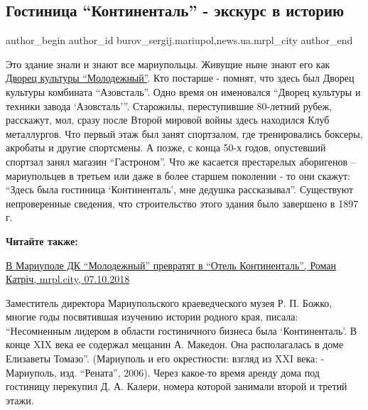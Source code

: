  
 
 
 
 
 
\subsection{Гостиница \enquote{Континенталь} - экскурс в историю}
\label{sec:22_12_2018.stz.news.ua.mrpl_city.1.gostinica_kontinental_ekskurs_v_istoriu}
 
\ifcmt
 author_begin
   author_id burov_sergij.mariupol,news.ua.mrpl_city
 author_end
\fi

Это здание знали и знают все мариупольцы. Живущие ныне знают его как \href{https://mrpl.city/blogs/dk-molodezhnyj}{Дворец
культуры \enquote{Молодежный}}. Кто постарше - помнят, что здесь был Дворец культуры
комбината \enquote{Азовсталь}. Одно время он именовался \enquote{Дворец культуры и техники
завода \enquote{Азовсталь}}. Старожилы, переступившие 80-летний рубеж, расскажут, мол,
сразу после Второй мировой войны здесь находился Клуб металлургов. Что первый
этаж был занят спортзалом, где тренировались боксеры, акробаты и другие
спортсмены. А позже, с конца 50-х годов, опустевший спортзал занял магазин
\enquote{Гастроном}. Что же касается престарелых аборигенов – мариупольцев в третьем
или даже в более старшем поколении - то они скажут: \enquote{Здесь была гостиница
\enquote{Континенталь}, мне дедушка рассказывал}. Существуют непроверенные сведения,
что строительство этого здания было завершено в 1897 г.

\textbf{Читайте также:} 

\href{https://mrpl.city/news/view/v-mariupole-dk-molodezhnyj-prevratyat-v-otel-kontinental}{%
В Мариуполе ДК \enquote{Молодежный} превратят в \enquote{Отель Континенталь}, Роман Катріч, mrpl.city, 07.10.2018}


Заместитель директора Мариупольского краеведческого музея Р. П. Божко, многие
годы посвятившая изучению истории родного края, писала: \enquote{Несомненным
лидером в области гостиничного бизнеса была \enquote{Континенталь}. В конце
XIX века ее содержал мещанин А. Македон. Она располагалась в доме Елизаветы
Томазо}. (Мариуполь и его окрестности: взгляд из XXI века: - Мариуполь, изд.
\enquote{Рената}, 2006). Через какое-то время аренду дома под гостиницу
перекупил Д. А. Калери, номера которой занимали второй и третий этажи.

